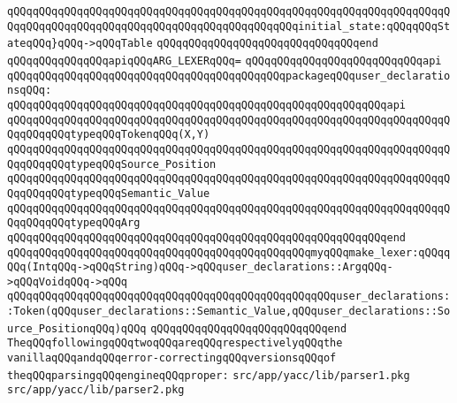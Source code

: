 \verb|qQQqqQQqqQQqqQQqqQQqqQQqqQQqqQQqqQQqqQQqqQQqqQQqqQQqqQQqqQQqqQQqqQQqqQQqqQQqqQQqqQQqqQQqqQQqqQQqqQQqqQQqqQQqqQQqqQQqinitial_state:qQQqqQQqStateqQQq}qQQq->qQQqTable|\newline
\verb|qQQqqQQqqQQqqQQqqQQqqQQqqQQqqQQqend|\newline
\newline
\verb|qQQqqQQqqQQqqQQqapiqQQqARG_LEXERqQQq=|\newline
\verb|qQQqqQQqqQQqqQQqqQQqqQQqqQQqapi|\newline
\verb|qQQqqQQqqQQqqQQqqQQqqQQqqQQqqQQqqQQqqQQqqQQqpackageqQQquser_declarationsqQQq:|\newline
\verb|qQQqqQQqqQQqqQQqqQQqqQQqqQQqqQQqqQQqqQQqqQQqqQQqqQQqqQQqqQQqapi|\newline
\verb|qQQqqQQqqQQqqQQqqQQqqQQqqQQqqQQqqQQqqQQqqQQqqQQqqQQqqQQqqQQqqQQqqQQqqQQqqQQqqQQqtypeqQQqTokenqQQq(X,Y)|\newline
\verb|qQQqqQQqqQQqqQQqqQQqqQQqqQQqqQQqqQQqqQQqqQQqqQQqqQQqqQQqqQQqqQQqqQQqqQQqqQQqqQQqtypeqQQqSource_Position|\newline
\verb|qQQqqQQqqQQqqQQqqQQqqQQqqQQqqQQqqQQqqQQqqQQqqQQqqQQqqQQqqQQqqQQqqQQqqQQqqQQqqQQqtypeqQQqSemantic_Value|\newline
\verb|qQQqqQQqqQQqqQQqqQQqqQQqqQQqqQQqqQQqqQQqqQQqqQQqqQQqqQQqqQQqqQQqqQQqqQQqqQQqqQQqtypeqQQqArg|\newline
\verb|qQQqqQQqqQQqqQQqqQQqqQQqqQQqqQQqqQQqqQQqqQQqqQQqqQQqqQQqqQQqend|\newline
\verb|qQQqqQQqqQQqqQQqqQQqqQQqqQQqqQQqqQQqqQQqqQQqqQQqmyqQQqmake_lexer:qQQqqQQq(IntqQQq->qQQqString)qQQq->qQQquser_declarations::ArgqQQq->qQQqVoidqQQq->qQQq|\newline
\verb|qQQqqQQqqQQqqQQqqQQqqQQqqQQqqQQqqQQqqQQqqQQqqQQqqQQquser_declarations::Token(qQQquser_declarations::Semantic_Value,qQQquser_declarations::Source_PositionqQQq)qQQq|\newline
\verb|qQQqqQQqqQQqqQQqqQQqqQQqqQQqend|\newline
\newline
\newline
\verb|TheqQQqfollowingqQQqtwoqQQqareqQQqrespectivelyqQQqthe|\newline
\verb|vanillaqQQqandqQQqerror-correctingqQQqversionsqQQqof|\newline
\verb|theqQQqparsingqQQqengineqQQqproper:|\newline
\verb|src/app/yacc/lib/parser1.pkg|\newline
\verb|src/app/yacc/lib/parser2.pkg|\newline
